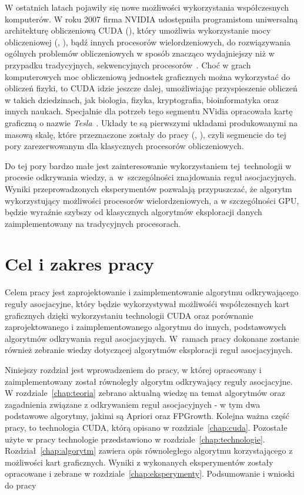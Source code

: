 W ostatnich latach pojawiły się nowe możliwości wykorzystania współczesnych komputerów. W roku 2007 firma NVIDIA udostępniła programistom uniwersalną architekturę obliczeniową CUDA (), który umożliwia wykorzystanie mocy obliczeniowej  (, ), bądź innych procesorów wielordzeniowych, do rozwiązywania ogólnych problemów obliczeniowych w sposób znacząco wydajniejszy niż w przypadku tradycyjnych, sekwencyjnych procesorów~\cite{cuda:zone}. Choć w grach komputerowych moc obliczeniową jednostek graficznych można wykorzystać do obliczeń fizyki, to CUDA idzie jeszcze dalej, umożliwiając przyspieszenie obliczeń w takich dziedzinach, jak biologia, fizyka, kryptografia, bioinformatyka oraz innych naukach. Specjalnie dla potrzeb tego segmentu NVidia opracowała kartę graficzną o nazwie \emph{Tesla}~\cite{cuda:tesla}. Układy te są pierwszymi układami produkowanymi na masową skalę, które przeznaczone zostały do pracy  (, ), czyli segmencie do tej pory zarezerwowanym dla klasycznych procesorów obliczeniowych.

Do tej pory bardzo małe jest zainteresowanie wykorzystaniem tej~technologii w procesie odkrywania wiedzy, a~w~szczególności znajdowania reguł asocjacyjnych. Wyniki przeprowadzonych eksperymentów pozwalają przypuszczać, że algorytm wykorzystujący możliwości procesorów wielordzeniowych, a w szczególności GPU, będzie wyraźnie szybszy od klasycznych algorytmów eksploracji danych zaimplementowany na tradycyjnych procesorach.

\section{Cel i zakres pracy}
Celem pracy jest zaprojektowanie i zaimplementowanie algorytmu odkrywającego reguły asocjacyjne, który będzie wykorzystywał możliwośći współczesnych kart graficznych dzięki wykorzystaniu technologii CUDA oraz porównanie zaprojektowanego i zaimplementowanego algorytmu do innych, podstawowych algorytmów odkrywania reguł asocjacyjnych. W~ramach pracy dokonane zostanie również zebranie wiedzy dotyczącej algorytmów eksploracji reguł asocjacyjnych.

Niniejszy rozdział jest wprowadzeniem do pracy, w której opracowany i zaimplementowany został równoległy algorytm odkrywający reguły asocjacyjne. W rozdziale~\ref{chap:teoria} zebrano aktualną wiedzę na temat algorytmów oraz zagadnienia związane z odkrywaniem reguł asocjacyjnych - w tym dwa podstawowe algorytmy, jakimi są Apriori oraz FPGrowth. Kolejna ważna część pracy, to technologia CUDA, którą opisano w rozdziale~\ref{chap:cuda}. Pozostałe użyte w pracy technologie przedstawiono w rozdziale~\ref{chap:technologie}. Rozdział~\ref{chap:algorytm} zawiera opis równoległego algorytmu korzystającego z możliwości kart graficznych. Wyniki z wykonanych eksperymentów zostały opracowane i zebrane w rozdziale~\ref{chap:eksperymenty}. Podsumowanie i wnioski do pracy 
